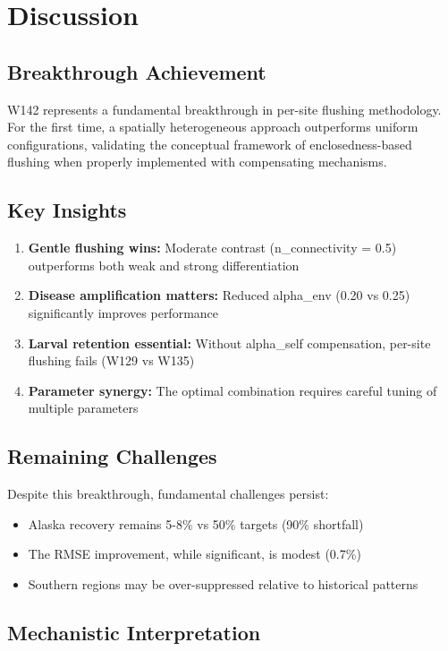 \documentclass[11pt,letterpaper]{article}
\begin{document}
\section{Discussion}

\subsection{Breakthrough Achievement}

W142 represents a fundamental breakthrough in per-site flushing methodology. For the first time, a spatially heterogeneous approach outperforms uniform configurations, validating the conceptual framework of enclosedness-based flushing when properly implemented with compensating mechanisms.

\subsection{Key Insights}

\begin{enumerate}
\item \textbf{Gentle flushing wins:} Moderate contrast (n\_connectivity = 0.5) outperforms both weak and strong differentiation
\item \textbf{Disease amplification matters:} Reduced alpha\_env (0.20 vs 0.25) significantly improves performance
\item \textbf{Larval retention essential:} Without alpha\_self compensation, per-site flushing fails (W129 vs W135)
\item \textbf{Parameter synergy:} The optimal combination requires careful tuning of multiple parameters
\end{enumerate}

\subsection{Remaining Challenges}

Despite this breakthrough, fundamental challenges persist:
\begin{itemize}
\item Alaska recovery remains 5-8\% vs 50\% targets (90\% shortfall)
\item The RMSE improvement, while significant, is modest (0.7\%)
\item Southern regions may be over-suppressed relative to historical patterns
\end{itemize}

\subsection{Mechanistic Interpretation}
\end{document}
